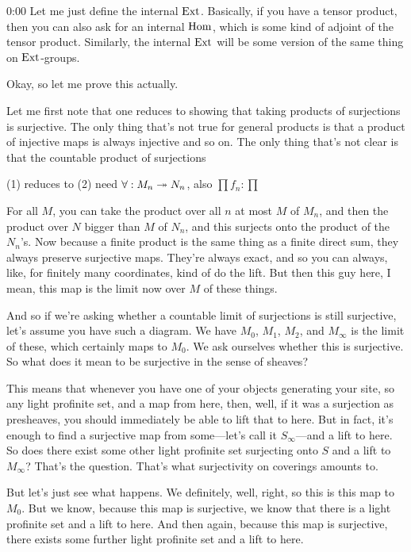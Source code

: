 \begin{unfinished}{0:00}
Let me just define the internal $\operatorname{Ext}$. Basically, if you have a tensor product, then you can also ask for an internal $\operatorname{Hom}$, which is some kind of adjoint of the tensor product. Similarly, the internal $\operatorname{Ext}$ will be some version of the same thing on $\operatorname{Ext}$-groups.

Okay, so let me prove this actually.

\begin{sketch}
Let me first note that one reduces to showing that taking products of surjections is surjective. The only thing that's not true for general products is that a product of injective maps is always injective and so on. The only thing that's not clear is that the countable product of surjections

(1) reduces to (2) need $\forall: M_n \twoheadrightarrow N_n$, also $\prod f_n: \prod$ %
\end{sketch}

For all $M$, you can take the product over all $n$ at most $M$ of $M_n$, and then the product over $N$ bigger than $M$ of $N_n$, and this surjects onto the product of the $N_n$'s. Now because a finite product is the same thing as a finite direct sum, they always preserve surjective maps. They're always exact, and so you can always, like, for finitely many coordinates, kind of do the lift. But then this guy here, I mean, this map is the limit now over $M$ of these things.

And so if we're asking whether a countable limit of surjections is still surjective, let's assume you have such a diagram. We have $M_0$, $M_1$, $M_2$, and $M_\infty$ is the limit of these, which certainly maps to $M_0$. We ask ourselves whether this is surjective. So what does it mean to be surjective in the sense of sheaves?

This means that whenever you have one of your objects generating your site, so any light profinite set, and a map from here, then, well, if it was a surjection as presheaves, you should immediately be able to lift that to here. But in fact, it's enough to find a surjective map from some---let's call it $S_\infty$---and a lift to here. So does there exist some other light profinite set surjecting onto $S$ and a lift to $M_\infty$? That's the question. That's what surjectivity on coverings amounts to.

But let's just see what happens. We definitely, well, right, so this is this map to $M_0$. But we know, because this map is surjective, we know that there is a light profinite set and a lift to here. And then again, because this map is surjective, there exists some further light profinite set and a lift to here.


\end{unfinished}
